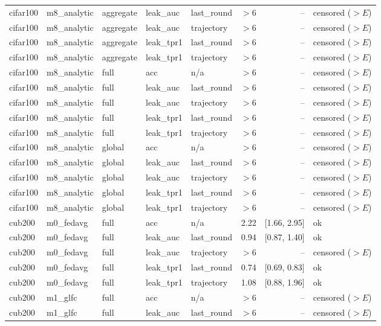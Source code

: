\begin{tabular}{lllllrrl}
cifar100 & m8\_analytic & aggregate & leak\_auc & last\_round & $>$6 & -- & censored ($>E$) \\
cifar100 & m8\_analytic & aggregate & leak\_auc & trajectory & $>$6 & -- & censored ($>E$) \\
cifar100 & m8\_analytic & aggregate & leak\_tpr1 & last\_round & $>$6 & -- & censored ($>E$) \\
cifar100 & m8\_analytic & aggregate & leak\_tpr1 & trajectory & $>$6 & -- & censored ($>E$) \\
cifar100 & m8\_analytic & full & acc & n/a & $>$6 & -- & censored ($>E$) \\
cifar100 & m8\_analytic & full & leak\_auc & last\_round & $>$6 & -- & censored ($>E$) \\
cifar100 & m8\_analytic & full & leak\_auc & trajectory & $>$6 & -- & censored ($>E$) \\
cifar100 & m8\_analytic & full & leak\_tpr1 & last\_round & $>$6 & -- & censored ($>E$) \\
cifar100 & m8\_analytic & full & leak\_tpr1 & trajectory & $>$6 & -- & censored ($>E$) \\
cifar100 & m8\_analytic & global & acc & n/a & $>$6 & -- & censored ($>E$) \\
cifar100 & m8\_analytic & global & leak\_auc & last\_round & $>$6 & -- & censored ($>E$) \\
cifar100 & m8\_analytic & global & leak\_auc & trajectory & $>$6 & -- & censored ($>E$) \\
cifar100 & m8\_analytic & global & leak\_tpr1 & last\_round & $>$6 & -- & censored ($>E$) \\
cifar100 & m8\_analytic & global & leak\_tpr1 & trajectory & $>$6 & -- & censored ($>E$) \\
cub200 & m0\_fedavg & full & acc & n/a & 2.22 & [1.66, 2.95] & ok \\
cub200 & m0\_fedavg & full & leak\_auc & last\_round & 0.94 & [0.87, 1.40] & ok \\
cub200 & m0\_fedavg & full & leak\_auc & trajectory & $>$6 & -- & censored ($>E$) \\
cub200 & m0\_fedavg & full & leak\_tpr1 & last\_round & 0.74 & [0.69, 0.83] & ok \\
cub200 & m0\_fedavg & full & leak\_tpr1 & trajectory & 1.08 & [0.88, 1.96] & ok \\
cub200 & m1\_glfc & full & acc & n/a & $>$6 & -- & censored ($>E$) \\
cub200 & m1\_glfc & full & leak\_auc & last\_round & $>$6 & -- & censored ($>E$) \\

\end{tabular}

